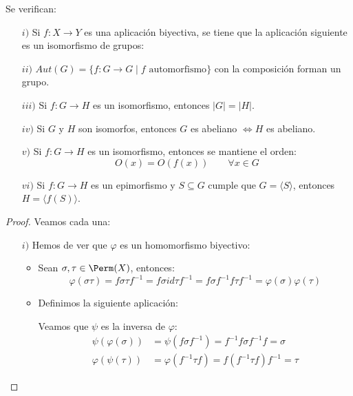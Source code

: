 \begin{prop}\label{prop:propiedades_grupos_isomorf}
    Se verifican:
    \begin{enumerate}
        \item[$i)$] Si $f:X\to Y$ es una aplicación biyectiva, se tiene que la aplicación siguiente es un isomorfismo de grupos:
        \item[$ii)$] $Aut(G) = \{f:G\to G \mid f \text{\ automorfismo}\}$ con la composición forman un grupo.
        \item[$iii)$] Si $f:G\to H$ es un isomorfismo, entonces $|G| = |H|$.
        \item[$iv)$] Si $G$ y $H$ son isomorfos, entonces $G$ es abeliano $\Longleftrightarrow H$ es abeliano.
        \item[$v)$] Si $f:G\to H$ es un isomorfismo, entonces se mantiene el orden:
            \begin{equation*}
                O(x) = O(f(x)) \qquad \forall x\in G
            \end{equation*}
        \item[$vi)$] Si $f:G\to H$ es un epimorfismo y $S\subseteq G$ cumple que $G= \langle S \rangle $, entonces $H=\langle f(S) \rangle $.
    \end{enumerate}
    \begin{proof}
        Veamos cada una:
        \begin{enumerate}
            \item[$i)$] Hemos de ver que $\varphi$ es un homomorfismo biyectivo:
                \begin{itemize}
                    \item Sean $\sigma,\tau \in \Perm(X)$, entonces:
                        \begin{equation*}
                            \varphi(\sigma\tau) = f\sigma\tau f^{-1} = f\sigma id \tau f^{-1} = f\sigma f^{-1}f\tau f^{-1} = \varphi(\sigma)\varphi(\tau)
                        \end{equation*}
                    \item Definimos la siguiente aplicación:  

                        Veamos que $\psi$ es la inversa de $\varphi$:
                        \begin{align*}
                            \psi(\varphi(\sigma)) &= \psi(f\sigma f^{-1}) = f^{-1}f\sigma f^{-1}f = \sigma \\
                            \varphi(\psi(\tau)) &= \varphi(f^{-1}\tau f) = f(f^{-1}\tau f)f^{-1} = \tau
                        \end{align*}


\end{itemize}
\end{enumerate}
\end{proof}
\end{prop}
